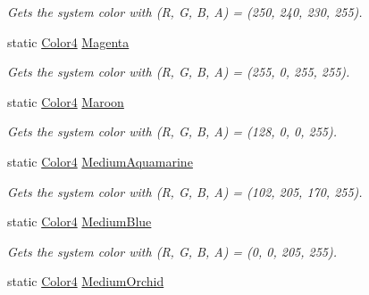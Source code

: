 \begin{DoxyCompactItemize}
\begin{DoxyCompactList}\small\item\em Gets the system color with (R, G, B, A) = (250, 240, 230, 255). \end{DoxyCompactList}\item 
static \hyperlink{struct_open_t_k_1_1_graphics_1_1_color4}{Color4} \hyperlink{struct_open_t_k_1_1_graphics_1_1_color4_aa88faac292b11b7bec104d892b8055a8}{Magenta}
\begin{DoxyCompactList}\small\item\em Gets the system color with (R, G, B, A) = (255, 0, 255, 255). \end{DoxyCompactList}\item 
static \hyperlink{struct_open_t_k_1_1_graphics_1_1_color4}{Color4} \hyperlink{struct_open_t_k_1_1_graphics_1_1_color4_a1858aa9fa61434b7cc548a8a7c2e674b}{Maroon}
\begin{DoxyCompactList}\small\item\em Gets the system color with (R, G, B, A) = (128, 0, 0, 255). \end{DoxyCompactList}\item 
static \hyperlink{struct_open_t_k_1_1_graphics_1_1_color4}{Color4} \hyperlink{struct_open_t_k_1_1_graphics_1_1_color4_a7b2c3014e316cf99c819e2c8cc85e6da}{Medium\-Aquamarine}
\begin{DoxyCompactList}\small\item\em Gets the system color with (R, G, B, A) = (102, 205, 170, 255). \end{DoxyCompactList}\item 
static \hyperlink{struct_open_t_k_1_1_graphics_1_1_color4}{Color4} \hyperlink{struct_open_t_k_1_1_graphics_1_1_color4_a849a225a4fb22bc38284909553a07ab1}{Medium\-Blue}
\begin{DoxyCompactList}\small\item\em Gets the system color with (R, G, B, A) = (0, 0, 205, 255). \end{DoxyCompactList}\item 
static \hyperlink{struct_open_t_k_1_1_graphics_1_1_color4}{Color4} \hyperlink{struct_open_t_k_1_1_graphics_1_1_color4_abd2e52c22e3b9a0261a6174daebad7c1}{Medium\-Orchid}

\end{DoxyCompactItemize}
